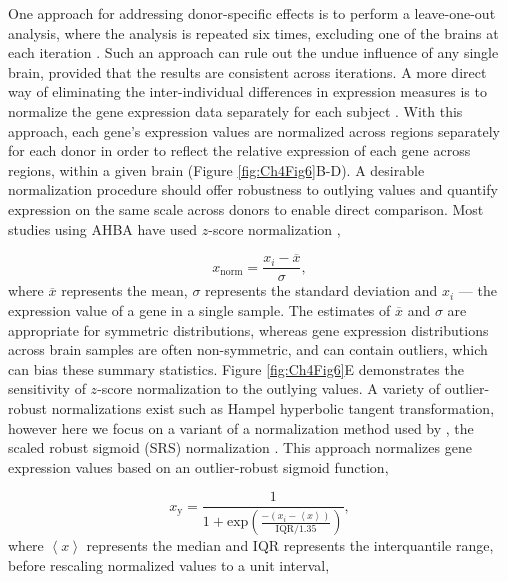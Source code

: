 One approach for addressing donor-specific effects is to perform a leave-one-out analysis, where the analysis is repeated six times, excluding one of the brains at each iteration  \citep{Parkes2017,McColgan2018}. Such an approach can rule out the undue influence of any single brain, provided that the results are consistent across iterations. A more direct way of eliminating the inter-individual differences in expression measures is to normalize the gene expression data separately for each subject \citep{Richiardi2015,Whitaker2016a,Vertes2016b,Rizzo2016,Liu2017,Negi2017,Burt2018,McColgan2018,Romero-Garcia2018a}. With this approach, each gene’s expression values are normalized across regions separately for each donor in order to reflect the relative expression of each gene across regions, within a given brain (Figure \ref{fig:Ch4Fig6}B-D). A desirable normalization procedure should offer robustness to outlying values and quantify expression on the same scale across donors to enable direct comparison. Most studies using AHBA have used $z$-score normalization \citep{Rizzo2016,Whitaker2016a,Vertes2016b,Negi2017,Romero-Garcia2018a},

\begin{equation}
    \label{eqn:eq1}
    x_\mathrm{norm} = \frac{x_\mathrm{\textit{i}}-\overline{x}}{\sigma},
\end{equation}
where $\overline{x}$ represents the mean, $\sigma$ represents the standard deviation and $x_\mathrm{\textit{i}}$ --- the expression value of a gene in a single sample. The estimates of $\overline{x}$ and $\sigma$ are appropriate for symmetric distributions, whereas gene expression distributions across brain samples are often non-symmetric, and can contain outliers, which can bias these summary statistics. Figure \ref{fig:Ch4Fig6}E demonstrates the sensitivity of $z$-score normalization to the outlying values.
A variety of outlier-robust normalizations exist such as Hampel hyperbolic tangent transformation, however here we focus on a variant of a normalization method used by \citet{Fulcher2016}, the scaled robust sigmoid (SRS) normalization \citep{Fulcher2013}. This approach normalizes gene expression values based on an outlier-robust sigmoid function,

\begin{equation}
    \label{eqn:eq2}
    x_\mathrm{y} = \frac{1}{1+\mathrm{exp}({\frac{-(x_\mathrm{\textit{i}}-\left\langle x \right\rangle)}{\mathrm{IQR}/1.35}})},
\end{equation}
where $\left\langle x \right\rangle$ represents the median and $\mathrm{IQR}$ represents the interquantile range, before rescaling normalized values to a unit interval,

